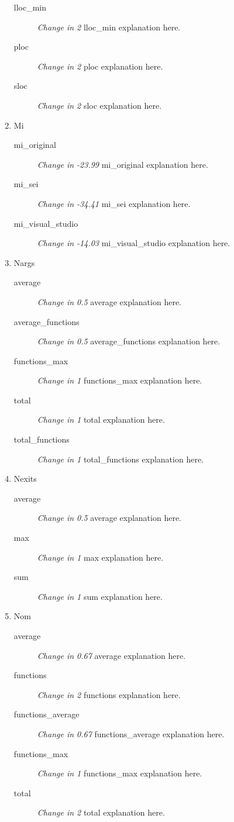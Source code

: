 \begin{enumerate}
\begin{description}
          \item [lloc\_min] \textit{Change in 2} lloc\_min explanation here.
          \item [ploc] \textit{Change in 2} ploc explanation here.
          \item [sloc] \textit{Change in 2} sloc explanation here.
        \end{description}
  \item Mi
        \begin{description}
          \item [mi\_original] \textit{Change in -23.99} mi\_original explanation here.
          \item [mi\_sei] \textit{Change in -34.41} mi\_sei explanation here.
          \item [mi\_visual\_studio] \textit{Change in -14.03} mi\_visual\_studio explanation here.
        \end{description}
  \item Nargs
        \begin{description}
          \item [average] \textit{Change in 0.5} average explanation here.
          \item [average\_functions] \textit{Change in 0.5} average\_functions explanation here.
          \item [functions\_max] \textit{Change in 1} functions\_max explanation here.
          \item [total] \textit{Change in 1} total explanation here.
          \item [total\_functions] \textit{Change in 1} total\_functions explanation here.
        \end{description}
  \item Nexits
        \begin{description}
          \item [average] \textit{Change in 0.5} average explanation here.
          \item [max] \textit{Change in 1} max explanation here.
          \item [sum] \textit{Change in 1} sum explanation here.
        \end{description}
  \item Nom
        \begin{description}
          \item [average] \textit{Change in 0.67} average explanation here.
          \item [functions] \textit{Change in 2} functions explanation here.
          \item [functions\_average] \textit{Change in 0.67} functions\_average explanation here.
          \item [functions\_max] \textit{Change in 1} functions\_max explanation here.
          \item [total] \textit{Change in 2} total explanation here.
        \end{description}
\end{enumerate}
